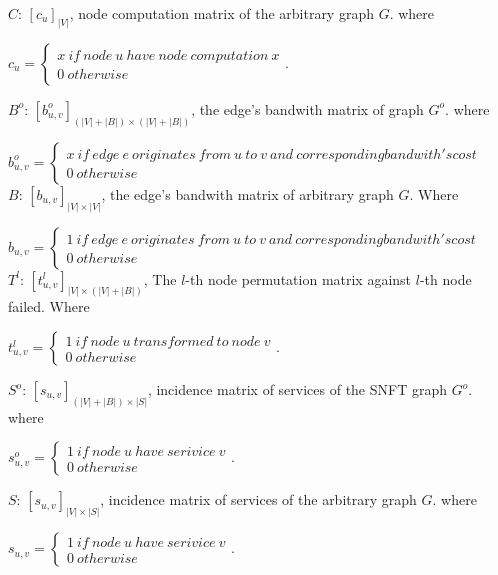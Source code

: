 $C$: $[c_{u}]_{|V|}$, node computation matrix of the arbitrary graph $G$. where

${c_{u}}=\left\{ \begin{array}{l}x\ if\ node\ u\ have\ node\ computation\ x\\
0\ otherwise
\end{array} \right.$.

$B^o$: $[b^o_{u,v}]_{(|V|+|B|)\times (|V|+|B|)}$, the edge's bandwith matrix of graph $G^o$. where

${b^o_{u,v}}=\left\{ \begin{array}{l}
x\ if\ edge\ e\ originates\ from\ u\ to\ v\ and\ corresponding bandwith's cost\\
0\ otherwise
\end{array} \right.$ \\

$B$: $[b_{u,v}]_{|V|\times |V|}$, the edge's bandwith matrix of arbitrary graph $G$. Where

${b_{u,v}}=\left\{ \begin{array}{l}
1\ if\ edge\ e\ originates\ from\ u\ to\ v\ and\ corresponding bandwith's cost\\
0\ otherwise
\end{array} \right.$ \\

$T^{l}$: $[t^l_{u,v}]_{|V|\times (|V|+|B|)}$, The $l$-th node permutation matrix against $l$-th node failed. Where

${t^l_{u,v}}=\left\{ \begin{array}{l}1\ if\ node\ u\ transformed\ to\ node\ v\\
0\ otherwise
\end{array} \right.$.

$S^o$: $[s_{u,v}]_{(|V|+|B|)\times |S|}$, incidence matrix of services of the SNFT graph $G^o$. where

${s^o_{u,v}}=\left\{ \begin{array}{l}1\ if\ node\ u\ have\ serivice\ v\\
0\ otherwise
\end{array} \right.$.

$S$: $[s_{u,v}]_{|V|\times |S|}$, incidence matrix of services of the arbitrary graph $G$. where

${s_{u,v}}=\left\{ \begin{array}{l}1\ if\ node\ u\ have\ serivice\ v\\
0\ otherwise
\end{array} \right.$.

